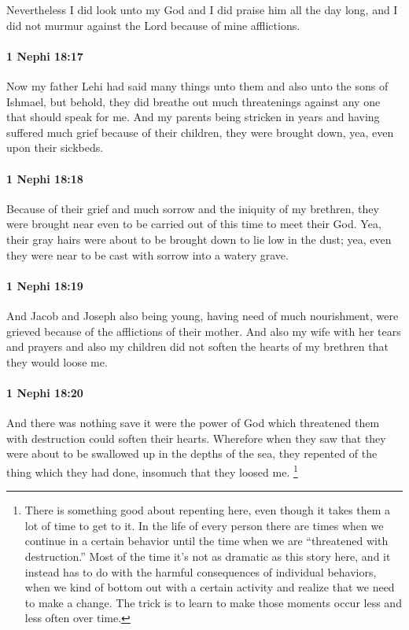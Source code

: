 			Nevertheless I did look unto my God
			and I did praise him all the day long,
			and I did not murmur against the Lord because of mine afflictions.

		\paragraph{1 Nephi 18:17} %
			\label{1NEPHI-18-17}

			Now my father Lehi had said many things unto them
			and also unto the sons of Ishmael,
			but behold, they did breathe out much threatenings
			against any one that should speak for me.
			And my parents being stricken in years
			and having suffered much grief because of their children,
			they were brought down, yea, even upon their sickbeds.

		\paragraph{1 Nephi 18:18} %
			\label{1NEPHI-18-18}

			Because of their grief and much sorrow and the iniquity of my brethren,
			they were brought near even to be carried out of this time to meet their God.
			Yea, their gray hairs were about to be brought down to lie low in the dust;
			yea, even they were near to be cast with sorrow into a watery grave.

		\paragraph{1 Nephi 18:19} %
			\label{1NEPHI-18-19}

			And Jacob and Joseph also being young,
			having need of much nourishment,
			were grieved because of the afflictions of their mother.
			And also my wife with her tears and prayers and also my children
			did not soften the hearts of my brethren
			that they would loose me.

		\paragraph{1 Nephi 18:20} %
			\label{1NEPHI-18-20}

			And there was nothing save it were the power of God
			which threatened them with destruction
			could soften their hearts.
			Wherefore when they saw that
			they were about to be swallowed up in the depths of the sea,
			they repented of the thing which they had done,
			insomuch that they loosed me.%
				\footnote{%
					\label{1NEPHI-18-20-NOTE-destruction}%
					There is something good about repenting here, even though it takes them a lot of time to get to it. In the life of every person there are times when we continue in a certain behavior until the time when we are ``threatened with destruction.'' Most of the time it's not as dramatic as this story here, and it instead has to do with the harmful consequences of individual behaviors, when we kind of bottom out with a certain activity and realize that we need to make a change. The trick is to learn to make those moments occur less and less often over time.
					}

